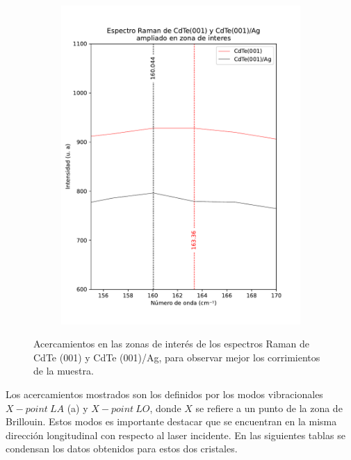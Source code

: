 \begin{figure}[H]
\begin{subfigure}[b]{0.49\textwidth}
        \includegraphics[width = 1\textwidth]{figures/chap4/cdte-ag/raman-results/raman-CdTeAg-250-T-zoom3.pdf}
    \end{subfigure}
\caption{Acercamientos en las zonas de interés de los espectros Raman de CdTe (001) y CdTe (001)/Ag, para observar mejor los corrimientos de la muestra.}
\label{fig:raman-cdte-zoom}
\end{figure}

Los acercamientos mostrados son los definidos por los modos vibracionales $X-point\ LA$ (a) y $X-point\ LO$, donde $X$ se refiere a un punto de la zona de Brillouin. Estos modos es importante destacar que se encuentran en la misma dirección longitudinal con respecto al laser incidente. En las siguientes tablas se condensan los datos obtenidos para estos dos cristales.

